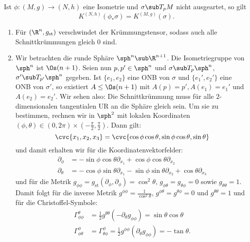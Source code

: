 \begin{bemerkung}
Ist $\phi:(M,g)\to (N,h)$ eine Isometrie und $\sigma \sub T_pM$ nicht ausgeartet, so gilt
\begin{equation}
K^{(N,h)} (\phi_\ast\sigma) = K^{(M,g)}(\sigma).
\end{equation}
\end{bemerkung}
\begin{beispiele}
\begin{enumerate}
\item Für $(\R^n, g_\text{st})$ verschwindet der Krümmungstensor, sodass auch alle Schnittkrümmungen gleich $0$ sind.
\item Wir betrachten die runde Sphäre $\sph^n \sub \R^{n+1}$. Die Isometriegruppe von $\sph^n$ ist $\Os(n+1)$. Seien nun $p,p' \in \sph^n$ und $\sigma \sub T_p\sph^n$, $\sigma' \sub T_{p'}\sph^n$ gegeben. Ist $\{e_1,e_2\}$ eine ONB von $\sigma$ und $\{e_1', e_2'\}$ eine ONB von $\sigma'$, so existiert $A \leq \Os(n+1)$ mit $A(p)=p', A(e_1)=e_1'$ und $A(e_2)=e_2'$. Wir sehen also: Die Schnittkrümmung muss für alle $2$-dimensionalen tangentialen UR an die Sphäre gleich sein. Um sie zu bestimmen, rechnen wir in $\sph^2$ mit lokalen Koordinaten $(\phi, \theta) \in (0,2\pi) \times (- \frac{\pi}{2}, \frac{\pi}{2})$. Dann gilt:
\begin{equation}
\cvc{x_1,x_2,x_3}=\cvc{\cos \phi \cos \theta, \sin \phi \cos \theta, \sin \theta}
\end{equation}
und damit erhalten wir für die Koordinatenvektorfelder:
\begin{align}
\partial_\phi &= - \sin \phi \cos \theta \partial_{x_1} + \cos \phi \cos \theta \partial_{x_2}\\
\partial_\theta &= - \cos \phi \sin \theta \partial_{x_1} - \sin \phi \sin \theta \partial_{x_2} + \cos \theta \partial_{x_3}
\end{align}
und für die Metrik $g_{\phi\phi}=g_\text{st}(\partial_\phi, \partial_\phi)=\cos^2 \theta$, $g_{\phi\theta}=g_{\theta\phi}=0$ sowie $g_{\theta\theta}=1$. Damit folgt für die inverse Metrik $g^{\phi\phi}=\frac{1}{\cos^2 \theta}$, $g^{\phi\theta}=g^{\theta\phi}=0$ und $g^{\theta\theta}=1$ und für die Christoffel-Symbole:
\begin{align}
\Gamma_{\phi\phi}^\theta &= \frac{1}{2} g^{\theta\theta}(-\partial_\theta g_{\phi\phi})=\sin \theta \cos \theta \\
\Gamma_{\phi\theta}^\phi&=\Gamma_{\theta \phi}^\phi=\frac{1}{2}g^{\phi\phi}(\partial_\theta g_{\phi\phi})=- \tan \theta.
\end{align}

\end{enumerate}
\end{beispiele}

